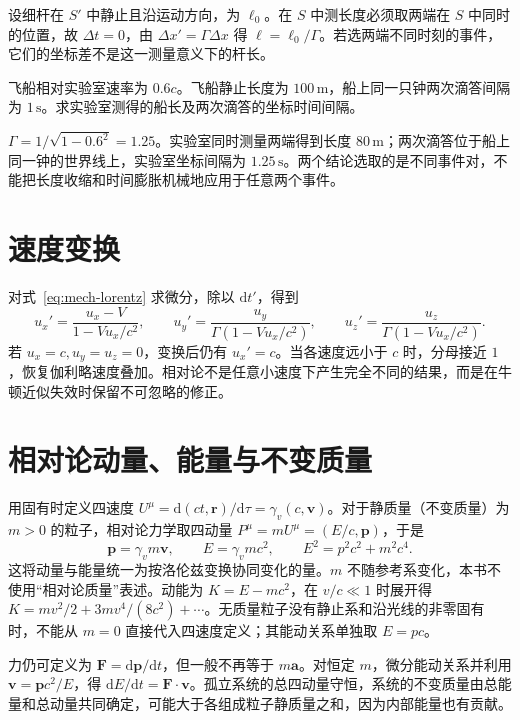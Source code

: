 \documentclass[UTF8,12pt,a4paper,fontset=fandol]{ctexbook}
\begin{document}
设细杆在 $S'$ 中静止且沿运动方向，为 $\ell_0$。在 $S$ 中测长度必须取两端在 $S$ 中同时的位置，故 $\Delta t=0$，由 $\Delta x'=\Gamma\Delta x$ 得 $\ell=\ell_0/\Gamma$。若选两端不同时刻的事件，它们的坐标差不是这一测量意义下的杆长。

\begin{example}[运动钟与运动杆]
飞船相对实验室速率为 $0.6c$。飞船静止长度为 $100\,\mathrm m$，船上同一只钟两次滴答间隔为 $1\,\mathrm s$。求实验室测得的船长及两次滴答的坐标时间间隔。
\end{example}
\begin{solve}
$\Gamma=1/\sqrt{1-0.6^2}=1.25$。实验室同时测量两端得到长度 $80\,\mathrm m$；两次滴答位于船上同一钟的世界线上，实验室坐标间隔为 $1.25\,\mathrm s$。两个结论选取的是不同事件对，不能把长度收缩和时间膨胀机械地应用于任意两个事件。
\end{solve}

\section{速度变换}
对式~\eqref{eq:mech-lorentz} 求微分，除以 $\mathrm dt'$，得到
\[
 u_x'=\frac{u_x-V}{1-Vu_x/c^2},\qquad
 u_y'=\frac{u_y}{\Gamma(1-Vu_x/c^2)},\qquad
 u_z'=\frac{u_z}{\Gamma(1-Vu_x/c^2)}.
\]
若 $u_x=c,u_y=u_z=0$，变换后仍有 $u_x'=c$。当各速度远小于 $c$ 时，分母接近 $1$，恢复伽利略速度叠加。相对论不是任意小速度下产生完全不同的结果，而是在牛顿近似失效时保留不可忽略的修正。

\section{相对论动量、能量与不变质量}
用固有时定义四速度 $U^\mu=\mathrm d(ct,\mathbf r)/\mathrm d\tau=\gamma_v(c,\mathbf v)$。对于静质量（不变质量）为 $m>0$ 的粒子，相对论力学取四动量 $P^\mu=mU^\mu=(E/c,\mathbf p)$，于是
\begin{equation}
 \mathbf p=\gamma_vm\mathbf v,\qquad E=\gamma_vmc^2,
 \qquad E^2=p^2c^2+m^2c^4.
 \label{eq:mech-relativistic-energy}
\end{equation}
这将动量与能量统一为按洛伦兹变换协同变化的量。$m$ 不随参考系变化，本书不使用“相对论质量”表述。动能为 $K=E-mc^2$，在 $v/c\ll1$ 时展开得 $K=mv^2/2+3mv^4/(8c^2)+\cdots$。无质量粒子没有静止系和沿光线的非零固有时，不能从 $m=0$ 直接代入四速度定义；其能动关系单独取 $E=pc$。

力仍可定义为 $\mathbf F=\mathrm d\mathbf p/\mathrm dt$，但一般不再等于 $m\mathbf a$。对恒定 $m$，微分能动关系并利用 $\mathbf v=\mathbf p c^2/E$，得 $\mathrm dE/\mathrm dt=\mathbf F\cdot\mathbf v$。孤立系统的总四动量守恒，系统的不变质量由总能量和总动量共同确定，可能大于各组成粒子静质量之和，因为内部能量也有贡献。
\end{document}
